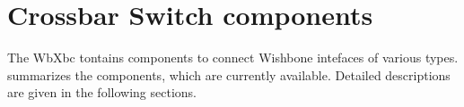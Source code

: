 
\section{Crossbar Switch components}
\label{comp}

The WbXbc tontains components to connect Wishbone intefaces of various types. 
 summarizes the components, which are currently available. 
Detailed descriptions are given in the following sections.


